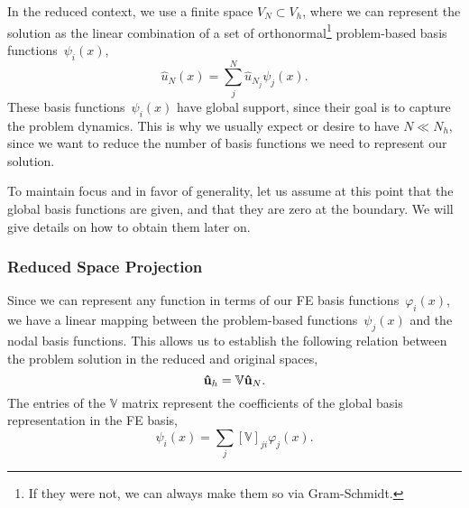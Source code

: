 \documentclass[../../thesis.tex]{subfiles}
\newcommand{\rbV}{\ensuremath{\mathbb{V}}}
\begin{document}
In the reduced context, we use a finite space $V_N \subset V_h$, where we can represent the solution as the linear combination of a set of orthonormal\footnote{If they were not, we can always make them so via Gram-Schmidt.} \mbox{problem-based} basis functions~$\psi_i(x)$,
\begin{equation}
    \label{eq:1d_rom_burgers_rb_expansion}
    \hat{u}_N(x) = \sum_j^{N} \hat{u}_{N_j} \psi_j(x).
\end{equation}
These basis functions~$\psi_i(x)$ have global support, since their goal is to capture the problem dynamics. 
This is why we usually expect or desire to have $N \ll N_h$, since we want to reduce the number of basis functions we need to represent our solution. 

To maintain focus and in favor of generality, let us assume at this point that the global basis functions are given, and that they are zero at the boundary.
We will give details on how to obtain them later on.

\subsubsection{Reduced Space Projection}
Since we can represent any function in terms of our FE basis functions~$\varphi_i(x)$, 
we have a linear mapping between the problem-based functions~$\psi_j(x)$ and the nodal basis functions.
This allows us to establish the following relation between the problem solution in the reduced and original spaces,
\begin{equation}
    \label{eq:1d_rom_burgers_projection_relation}
    \vb{\hat{u}}_h = \rbV \vb{\hat{u}}_N.
\end{equation}
The entries of the $\rbV$ matrix represent the coefficients of the global basis representation in the FE basis, 
\begin{equation}
    \psi_i(x) = \sum_j \left[\mathbb{V}\right]_{ji}\varphi_j(x).
\end{equation}

\end{document}
